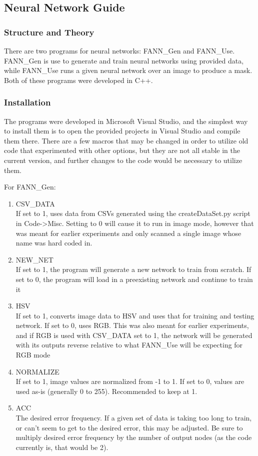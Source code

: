 \documentclass[10pt,journal,compsoc, draftclsnofoot,onecolumn]{IEEEtran}
\begin{document}
\subsection{Neural Network Guide}

\subsubsection{Structure and Theory}
There are two programs for neural networks: FANN\_Gen and FANN\_Use. FANN\_Gen is use to generate and train neural networks using provided data, while FANN\_Use runs a given neural network over an image to produce a mask. Both of these programs were developed in C++.

\subsubsection{Installation}
The programs were developed in Microsoft Visual Studio, and the simplest way to install them is to open the provided projects in Visual Studio and compile them there. There are a few macros that may be changed in order to utilize old code that experimented with other options, but they are not all stable in the current version, and further changes to the code would be necessary to utilize them.

For FANN\_Gen:
\begin{enumerate}
\item CSV\_DATA \\
If set to 1, uses data from CSVs generated using the createDataSet.py script in Code->Misc. Setting to 0 will cause it to run in image mode, however that was meant for earlier experiments and only scanned a single image whose name was hard coded in.

\item NEW\_NET  \\
If set to 1, the program will generate a new network to train from scratch. If set to 0, the program will load in a preexisting network and continue to train it

\item HSV \\
If set to 1, converts image data to HSV and uses that for training and testing network. If set to 0, uses RGB. This was also meant for earlier experiments, and if RGB is used with CSV\_DATA set to 1, the network will be generated with its outputs reverse relative to what FANN\_Use will be expecting for RGB mode

\item NORMALIZE \\
If set to 1, image values are normalized from -1 to 1. If set to 0, values are used as-is (generally 0 to 255). Recommended to keep at 1.

\item ACC \\
The desired error frequency. If a given set of data is taking too long to train, or can't seem to get to the desired error, this may be adjusted. Be sure to multiply desired error frequency by the number of output nodes (as the code currently is, that would be 2).
\end{enumerate}
\end{document}
